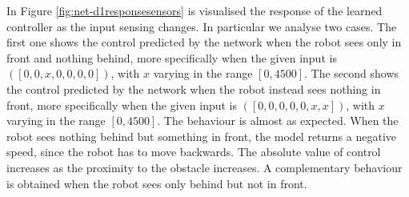 In Figure \ref{fig:net-d1responsesensors} is visualised the response of the learned 
controller as the input sensing changes. 
In particular we analyse two cases. The first one shows the control predicted by 
the network when the robot sees only in front and nothing behind, more 
specifically when the given input is  $([0, 0, x, 0, 0, 0, 0])$, with $x$ varying in the 
range $[0, 4500]$.
The second shows the control predicted by the network when the robot instead 
sees nothing in front, more specifically when the given input is  $([0, 0, 0, 0, 0,x , 
x])$, with $x$ varying in the range $[0, 4500]$.
The behaviour is almost as expected. When the robot sees nothing behind but 
something in front, the model returns a negative speed, since the robot has to 
move backwards. 
The absolute value of control increases as the proximity to the obstacle increases.
A complementary behaviour is obtained when the robot sees only behind but 
not in front.
